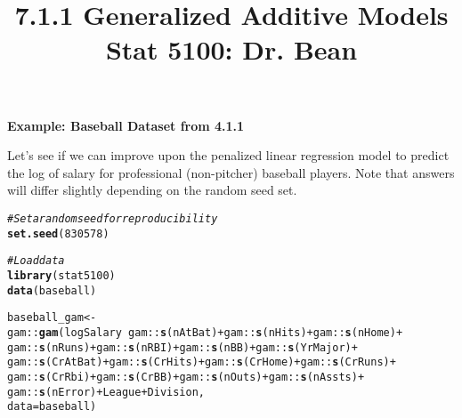 \documentclass{article}\usepackage[]{graphicx}\usepackage[]{color}
\makeatletter
\newcommand{\hlnum}[1]{\textcolor[rgb]{0.686,0.059,0.569}{#1}}%
\newcommand{\hlcom}[1]{\textcolor[rgb]{0.678,0.584,0.686}{\textit{#1}}}%
\newcommand{\hlopt}[1]{\textcolor[rgb]{0,0,0}{#1}}%
\newcommand{\hlstd}[1]{\textcolor[rgb]{0.345,0.345,0.345}{#1}}%
\newcommand{\hlkwb}[1]{\textcolor[rgb]{0.69,0.353,0.396}{#1}}%
\newcommand{\hlkwc}[1]{\textcolor[rgb]{0.333,0.667,0.333}{#1}}%
\newcommand{\hlkwd}[1]{\textcolor[rgb]{0.737,0.353,0.396}{\textbf{#1}}}%
\newenvironment{kframe}{%
 \def\at@end@of@kframe{}%
 \ifinner\ifhmode%
  \def\at@end@of@kframe{\end{minipage}}%
  \begin{minipage}{\columnwidth}%
 \fi\fi%
 \def\FrameCommand##1{\hskip\@totalleftmargin \hskip-\fboxsep
 \colorbox{shadecolor}{##1}\hskip-\fboxsep
     \hskip-\linewidth \hskip-\@totalleftmargin \hskip\columnwidth}%
 \MakeFramed {\advance\hsize-\width
   \@totalleftmargin\z@ \linewidth\hsize
   \@setminipage}}%
 {\par\unskip\endMakeFramed%
 \at@end@of@kframe}
\newenvironment{knitrout}{}{} %
\makeatother
\begin{document}
\title{%
  7.1.1 Generalized Additive Models \\
  \smallskip
  \large Stat 5100: Dr. Bean
}
\date{}

\maketitle

\textbf{Example: Baseball Dataset from 4.1.1}

Let's see if we can improve upon the penalized linear regression model to predict the log of salary for professional (non-pitcher) baseball players. Note that answers will differ slightly depending on the random seed set.

\begin{knitrout}
\color{fgcolor}\begin{kframe}
\begin{alltt}
\hlcom{# Set a random seed for reproducibility}
\hlkwd{set.seed}\hlstd{(}\hlnum{830578}\hlstd{)}

\hlcom{# Load data}
\hlkwd{library}\hlstd{(stat5100)}
\hlkwd{data}\hlstd{(baseball)}

\hlstd{baseball_gam} \hlkwb{<-}
  \hlstd{gam}\hlopt{::}\hlkwd{gam}\hlstd{(logSalary} \hlopt{~} \hlstd{gam}\hlopt{::}\hlkwd{s}\hlstd{(nAtBat)} \hlopt{+} \hlstd{gam}\hlopt{::}\hlkwd{s}\hlstd{(nHits)} \hlopt{+} \hlstd{gam}\hlopt{::}\hlkwd{s}\hlstd{(nHome)} \hlopt{+}
             \hlstd{gam}\hlopt{::}\hlkwd{s}\hlstd{(nRuns)} \hlopt{+} \hlstd{gam}\hlopt{::}\hlkwd{s}\hlstd{(nRBI)} \hlopt{+} \hlstd{gam}\hlopt{::}\hlkwd{s}\hlstd{(nBB)} \hlopt{+} \hlstd{gam}\hlopt{::}\hlkwd{s}\hlstd{(YrMajor)} \hlopt{+}
             \hlstd{gam}\hlopt{::}\hlkwd{s}\hlstd{(CrAtBat)} \hlopt{+} \hlstd{gam}\hlopt{::}\hlkwd{s}\hlstd{(CrHits)} \hlopt{+} \hlstd{gam}\hlopt{::}\hlkwd{s}\hlstd{(CrHome)} \hlopt{+} \hlstd{gam}\hlopt{::}\hlkwd{s}\hlstd{(CrRuns)} \hlopt{+}
             \hlstd{gam}\hlopt{::}\hlkwd{s}\hlstd{(CrRbi)} \hlopt{+} \hlstd{gam}\hlopt{::}\hlkwd{s}\hlstd{(CrBB)} \hlopt{+} \hlstd{gam}\hlopt{::}\hlkwd{s}\hlstd{(nOuts)} \hlopt{+} \hlstd{gam}\hlopt{::}\hlkwd{s}\hlstd{(nAssts)} \hlopt{+}
             \hlstd{gam}\hlopt{::}\hlkwd{s}\hlstd{(nError)} \hlopt{+} \hlstd{League} \hlopt{+} \hlstd{Division,}
                         \hlkwc{data} \hlstd{= baseball)}


\end{alltt}
\end{kframe}
\end{knitrout}
\end{document}
